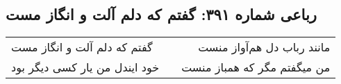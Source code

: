 \begin{center}
\section*{رباعی شماره ۳۹۱: گفتم که دلم آلت و انگاز مست}
\label{sec:0391}
\begin{longtable}{l p{0.5cm} r}
گفتم که دلم آلت و انگاز مست
&&
مانند رباب دل هم‌آواز منست
\\
خود ایندل من یار کسی دیگر بود
&&
من میگفتم مگر که همباز منست
\\
\end{longtable}
\end{center}
